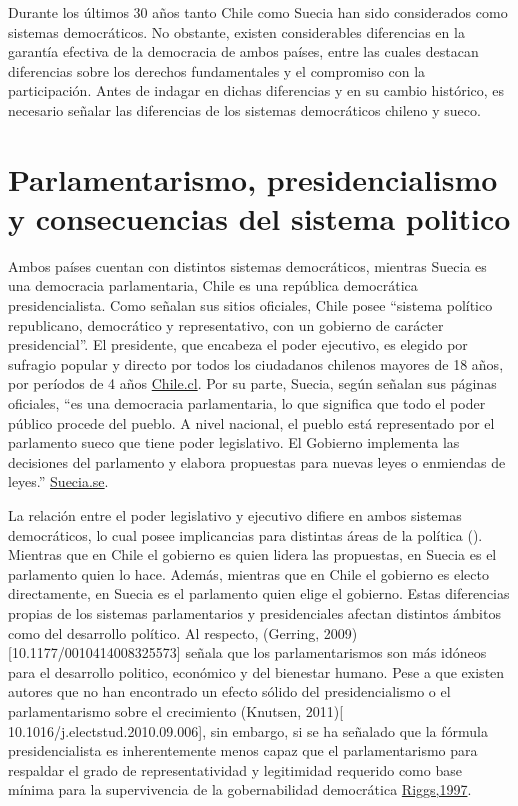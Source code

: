 \documentclass[12pt,twoside]{templates/facsothesis}
\begin{document}
Durante los últimos 30 años tanto Chile como Suecia han sido considerados como sistemas democráticos. No obstante, existen considerables diferencias en la garantía efectiva de la democracia de ambos países, entre las cuales destacan diferencias sobre los derechos fundamentales y el compromiso con la participación. Antes de indagar en dichas diferencias y en su cambio histórico, es necesario señalar las diferencias de los sistemas democráticos chileno y sueco.

\hypertarget{parlamentarismo-presidencialismo-y-consecuencias-del-sistema-politico}{%
\section{Parlamentarismo, presidencialismo y consecuencias del sistema politico}\label{parlamentarismo-presidencialismo-y-consecuencias-del-sistema-politico}}

Ambos países cuentan con distintos sistemas democráticos, mientras Suecia es una democracia parlamentaria, Chile es una república democrática presidencialista. Como señalan sus sitios oficiales, Chile posee ``sistema político republicano, democrático y representativo, con un gobierno de carácter presidencial''. El presidente, que encabeza el poder ejecutivo, es elegido por sufragio popular y directo por todos los ciudadanos chilenos mayores de 18 años, por períodos de 4 años \href{https://chile.gob.cl/chile/sistema-politico}{Chile.cl}. Por su parte, Suecia, según señalan sus páginas oficiales, ``es una democracia parlamentaria, lo que significa que todo el poder público procede del pueblo. A nivel nacional, el pueblo está representado por el parlamento sueco que tiene poder legislativo. El Gobierno implementa las decisiones del parlamento y elabora propuestas para nuevas leyes o enmiendas de leyes.'' \href{https://www.government.se/how-sweden-is-governed/}{Suecia.se}.

La relación entre el poder legislativo y ejecutivo difiere en ambos sistemas democráticos, lo cual posee implicancias para distintas áreas de la política (). Mientras que en Chile el gobierno es quien lidera las propuestas, en Suecia es el parlamento quien lo hace. Además, mientras que en Chile el gobierno es electo directamente, en Suecia es el parlamento quien elige el gobierno. Estas diferencias propias de los sistemas parlamentarios y presidenciales afectan distintos ámbitos como del desarrollo político. Al respecto, (Gerring, 2009){[}10.1177/0010414008325573{]} señala que los parlamentarismos son más idóneos para el desarrollo politico, económico y del bienestar humano. Pese a que existen autores que no han encontrado un efecto sólido del presidencialismo o el parlamentarismo sobre el crecimiento (Knutsen, 2011){[} 10.1016/j.electstud.2010.09.006{]}, sin embargo, si se ha señalado que la fórmula presidencialista es inherentemente menos capaz que el parlamentarismo para respaldar el grado de representatividad y legitimidad requerido como base mínima para la supervivencia de la gobernabilidad democrática \href{10.1177/019251297018003003}{Riggs,1997}.
\end{document}
